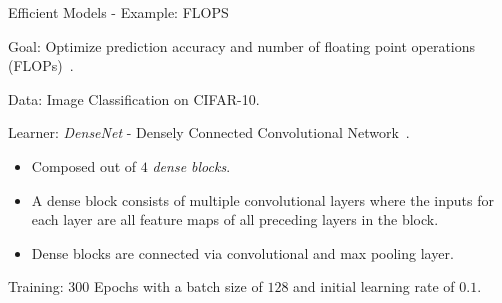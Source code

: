 \begin{frame}{Efficient Models - Example: FLOPS}

    Goal: Optimize prediction accuracy and number of floating point operations (FLOPs)~.

    \vspace{0.5cm}

    Data: Image Classification on CIFAR-10.

    \vspace{0.5cm}

    Learner: \emph{DenseNet} - Densely Connected Convolutional Network~.

    \begin{itemize}
        \item Composed out of $4$ \emph{dense blocks}.
        \item A dense block consists of multiple convolutional layers where the inputs for each layer are all feature maps of all preceding layers in the block.
        \item Dense blocks are connected via convolutional and max pooling layer.
    \end{itemize}

    \vspace{0.5cm}

    Training: $300$ Epochs with a batch size of $128$ and initial learning rate of $0.1$.

\end{frame}

